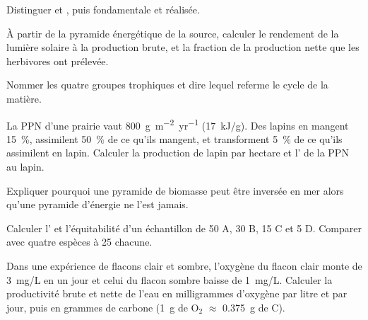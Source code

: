 \begin{exercise}[$\star$]\label{exo:b1:ecosystem-organization:2}
Distinguer  et , puis  fondamentale et  réalisée.
\end{exercise}

\begin{exercise}[$\star$]\label{exo:b1:ecosystem-organization:3}
À partir de la pyramide énergétique de la source, calculer le rendement
de la lumière solaire à la production brute, et la fraction de la
production nette que les herbivores ont prélevée.
\end{exercise}

\begin{exercise}[$\star$]\label{exo:b1:ecosystem-organization:4}
Nommer les quatre groupes trophiques et dire lequel referme le cycle de
la matière.
\end{exercise}

\begin{exercise}[$\star\star$]\label{exo:b1:ecosystem-organization:5}
La PPN d'une prairie vaut \qty{800}{g.m^{-2}.yr^{-1}} (\qty{17}{kJ/g}).
Des lapins en mangent \qty{15}{\%}, assimilent \qty{50}{\%} de ce
qu'ils mangent, et transforment \qty{5}{\%} de ce qu'ils assimilent en
lapin. Calculer la production de lapin par hectare et l' de la PPN au lapin.
\end{exercise}

\begin{exercise}[$\star\star$]\label{exo:b1:ecosystem-organization:6}
Expliquer pourquoi une pyramide de biomasse peut être inversée en mer
alors qu'une pyramide d'énergie ne l'est jamais.
\end{exercise}

\begin{exercise}[$\star\star$]\label{exo:b1:ecosystem-organization:7}
Calculer l' et l'équitabilité d'un échantillon de
50 A, 30 B, 15 C et 5 D. Comparer avec quatre espèces à 25 chacune.
\end{exercise}

\begin{exercise}[$\star\star$]\label{exo:b1:ecosystem-organization:8}
Dans une expérience de flacons clair et sombre, l'oxygène du flacon
clair monte de \qty{3}{mg/L} en un jour et celui du flacon sombre
baisse de \qty{1}{mg/L}. Calculer la productivité brute et nette de
l'eau en milligrammes d'oxygène par litre et par jour, puis en grammes
de carbone (\qty{1}{g} de $\mathrm{O_2}$ $\approx$ \qty{0.375}{g} de C).
\end{exercise}

